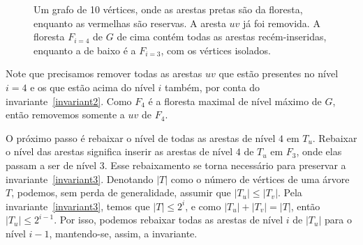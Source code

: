 \begin{figure}[H]
\begin{minipage}[c]{0.8\textwidth}
    \end{minipage}
    \caption{Um grafo de 10 vértices, onde as arestas pretas são da floresta, enquanto as vermelhas são reservas. A aresta $uv$ já foi removida. A floresta $F_{i = 4}$ de $G$ de cima contém todas as arestas recém-inseridas, enquanto a de baixo é a $F_{i = 3}$, com os vértices isolados.}
    \vspace{-1cm}
    \label{fig:example-replacement1}
\end{figure}

Note que precisamos remover todas as arestas $uv$ que estão presentes no nível $i = 4$ e os que estão acima do nível $i$ também, por conta do invariante~\ref{invariant2}. Como $F_4$ é a floresta maximal de nível máximo de $G$, então removemos somente a $uv$ de $F_4$. 

O próximo passo é rebaixar o nível de todas as arestas de nível $4$ em $T_u$. Rebaixar o nível das arestas significa inserir as arestas de nível $4$ de $T_u$ em $F_3$, onde elas passam a ser de nível $3$. Esse rebaixamento se torna necessário para preservar a invariante~\ref{invariant3}. Denotando $|T|$ como o número de vértices de uma árvore $T$, podemos, sem perda de generalidade, assumir que $|T_u| \leq |T_v|$. Pela invariante~\ref{invariant3}, temos que $|T| \leq 2^i$, e como $|T_u| + |T_v| = |T|$, então $|T_u| \leq 2^{i-1}$. Por isso, podemos rebaixar todas as arestas de nível $i$ de $|T_u|$ para o nível $i-1$, mantendo-se, assim, a invariante. 

